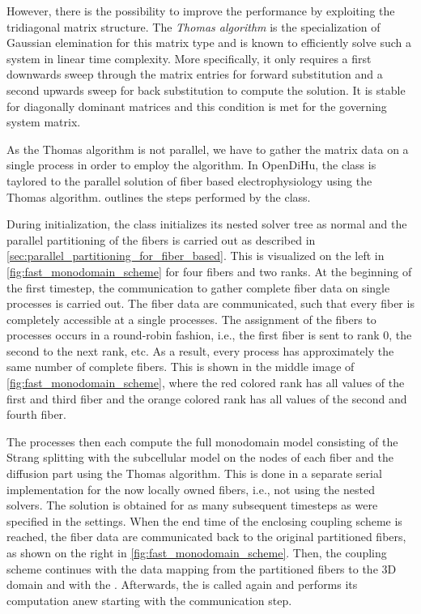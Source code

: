 However, there is the possibility to improve the performance by exploiting the tridiagonal matrix structure. The \emph{Thomas algorithm} is the specialization of Gaussian elemination for this matrix type and is known to efficiently solve such a system in linear time complexity. More specifically, it only requires a first downwards sweep through the matrix entries for forward substitution and a second upwards sweep for back substitution to compute the solution. It is stable for diagonally dominant matrices and this condition is met for the governing system matrix.

As the Thomas algorithm is not parallel, we have to gather the matrix data on a single process in order to employ the algorithm. In OpenDiHu, the  class is taylored to the parallel solution of fiber based electrophysiology using the Thomas algorithm. 
 outlines the steps performed by the  class.

During initialization, the  class initializes its nested solver tree as normal and the parallel partitioning of the fibers is carried out as described in \cref{sec:parallel_partitioning_for_fiber_based}. This is visualized on the left in \cref{fig:fast_monodomain_scheme} for four fibers and two ranks. At the beginning of the first timestep, the communication to gather complete fiber data on single processes is carried out. The fiber data are communicated, such that every fiber is completely accessible at a single processes. The assignment of the fibers to processes occurs in a round-robin fashion, i.e., the first fiber is sent to rank 0, the second to the next rank, etc. As a result, every process has approximately the same number of complete fibers. 
This is shown in the middle image of \cref{fig:fast_monodomain_scheme}, where the red colored rank has all values of the first and third fiber and the orange colored rank has all values of the second and fourth fiber.

The processes then each compute the full monodomain model consisting of the Strang splitting with the subcellular model on the nodes of each fiber and the diffusion part using the Thomas algorithm. 
This is done in a separate serial implementation for the now locally owned fibers, i.e., not using the nested solvers. The solution is obtained for as many subsequent timesteps as were specified in the settings. When the end time of the enclosing coupling scheme is reached, the fiber data are communicated back to the original partitioned fibers, as shown on the right in \cref{fig:fast_monodomain_scheme}.
Then, the coupling scheme continues with the data mapping from the partitioned fibers to the 3D domain and with the . Afterwards, the  is called again and performs its computation anew starting with the communication step.

